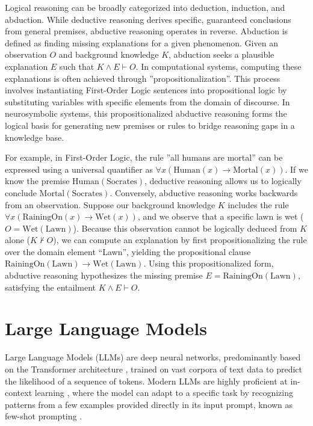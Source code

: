 Logical reasoning can be broadly categorized into deduction, induction, and abduction. While deductive reasoning derives specific, guaranteed conclusions from general premises, abductive reasoning operates in reverse. Abduction is defined as finding missing explanations for a given phenomenon. Given an observation $O$ and background knowledge $K$, abduction seeks a plausible explanation $E$ such that $K \land E \vdash O$. In computational systems, computing these explanations is often achieved through ''propositionalization''. This process involves instantiating First-Order Logic sentences into propositional logic by substituting variables with specific elements from the domain of discourse. In neurosymbolic systems, this propositionalized abductive reasoning forms the logical basis for generating new premises or rules to bridge reasoning gaps in a knowledge base.

For example, in First-Order Logic, the rule ''all humans are mortal'' can be expressed using a universal quantifier as $\forall x (\text{Human}(x) \rightarrow \text{Mortal}(x))$. If we know the premise $\text{Human}(\text{Socrates})$, deductive reasoning allows us to logically conclude $\text{Mortal}(\text{Socrates})$. Conversely, abductive reasoning works backwards from an observation. Suppose our background knowledge $K$ includes the rule $\forall x (\text{RainingOn}(x) \rightarrow \text{Wet}(x))$, and we observe that a specific lawn is wet ($O = \text{Wet}(\text{Lawn})$). Because this observation cannot be logically deduced from $K$ alone ($K \not\vdash O$), we can compute an explanation by first propositionalizing the rule over the domain element ``Lawn'', yielding the propositional clause $\text{RainingOn}(\text{Lawn}) \rightarrow \text{Wet}(\text{Lawn})$. Using this propositionalized form, abductive reasoning hypothesizes the missing premise $E = \text{RainingOn}(\text{Lawn})$, satisfying the entailment $K \land E \vdash O$.


\section{Large Language Models}
\label{sec:largeLanguageModels}
Large Language Models (LLMs) are deep neural networks, predominantly based on the Transformer architecture \citep{vaswani2017attention}, trained on vast corpora of text data to predict the likelihood of a sequence of tokens. Modern LLMs are highly proficient at in-context learning \citep{dong-etal-2024-survey}, where the model can adapt to a specific task by recognizing patterns from a few examples provided directly in its input prompt, known as few-shot prompting \citep{DBLP:journals/corr/abs-2005-14165}.

